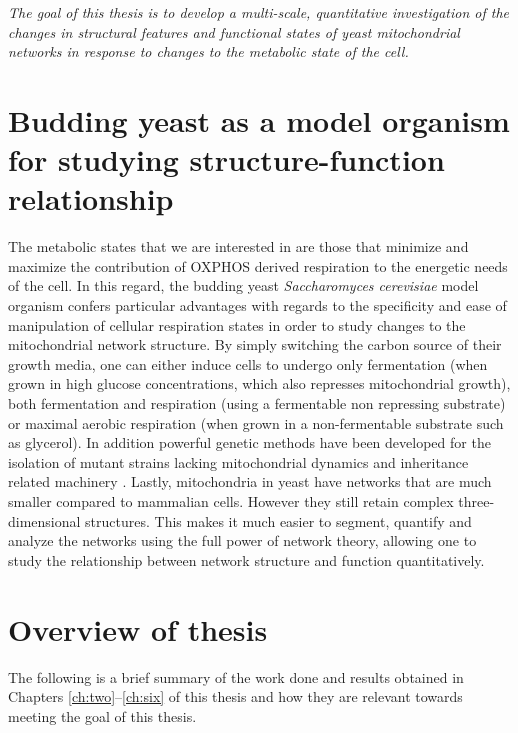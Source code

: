\emph{The goal of this thesis is to develop a multi-scale, quantitative investigation of the changes in structural features and functional states of yeast mitochondrial networks in response to changes to the metabolic state of the cell.}
\section{Budding yeast as a model organism for studying structure-function relationship}
The metabolic states that we are interested in are those that minimize and maximize the contribution of OXPHOS derived respiration to the energetic needs of the cell. In this regard, the budding yeast \textit{Saccharomyces cerevisiae} model organism confers particular advantages with regards to the specificity and ease of manipulation of cellular respiration states in order to study changes to the mitochondrial network structure. By simply switching the carbon source of their growth media, one can either induce cells to undergo only fermentation (when grown in high glucose concentrations, which also represses mitochondrial growth), both fermentation and respiration (using a fermentable non repressing substrate) or maximal aerobic respiration (when grown in a non-fermentable substrate such as glycerol). In addition powerful genetic methods have been developed for the isolation of mutant strains lacking mitochondrial dynamics \cite{sesaki_division_1999,kanki_atg32_2009} and inheritance related machinery \cite{itoh_complex_2002, itoh_mmr1p_2004}. Lastly, mitochondria in yeast have networks that are much smaller compared to mammalian cells. However they still retain complex three-dimensional structures. This makes it much easier to segment, quantify and analyze the networks using the full power of network theory, allowing one to study the relationship between network structure and function quantitatively. 
\section{Overview of thesis}
The following is a brief summary of the work done and results obtained in Chapters \ref{ch:two}--\ref{ch:six} of this thesis and how they are relevant towards meeting the goal of this thesis.


